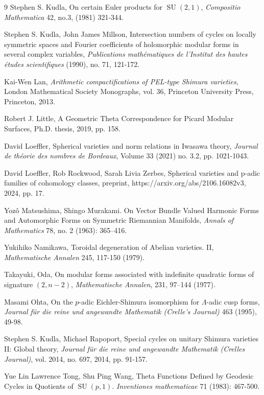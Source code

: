 \documentclass[12pt,a4paper,reqno]{amsart}
\theoremstyle{definition}
\numberwithin{definition}{subsection}
\theoremstyle{definition}
\numberwithin{Definition}{subsection}
\theoremstyle{remark}
\theoremstyle{remark}
\numberwithin{Remark}{subsection}
\theoremstyle{remark}
\theoremstyle{plain}
\numberwithin{Theorem}{subsection}
\theoremstyle{plain}
\theoremstyle{plain}
\theoremstyle{plain}
\theoremstyle{plain}
\theoremstyle{plain}
\theoremstyle{plain}
\theoremstyle{plain}
\DeclareMathOperator{\SU}{SU}
\begin{document}
\begin{thebibliography}{9}
Stephen S. Kudla, On certain Euler products for $\SU(2,1)$, \textit{Compositio Mathematica} 42, no.3, (1981) 321-344.

Stephen S. Kudla, John James Millson, Intersection numbers of cycles on locally symmetric spaces and Fourier
coefficients of holomorphic modular forms in several complex variables, \textit{Publications mathématiques de l'Institut des hautes études scientifiques} (1990), no. 71, 121-172.

Kai-Wen Lan, \emph{Arithmetic compactifications of PEL-type Shimura varieties}, London Mathematical Society Monographs, vol. 36, Princeton University Press, Princeton, 2013.

Robert J. Little, A Geometric Theta Correspondence for Picard Modular Surfaces, Ph.D. thesis, 2019, pp. 158.

David Loeffler, Spherical varieties and norm relations in Iwasawa theory, \textit{Journal de théorie des nombres de Bordeaux}, Volume 33 (2021) no. 3.2, pp. 1021-1043. 

David Loeffler, Rob Rockwood, Sarah Livia Zerbes, Spherical varieties and p-adic families of cohomology classes, preprint, https://arxiv.org/abs/2106.16082v3, 2024, pp. 17.

Yozô Matsushima, Shingo Murakami. On Vector Bundle Valued Harmonic Forms and Automorphic Forms on Symmetric Riemannian Manifolds, \textit{Annals of Mathematics} 78, no. 2 (1963): 365–416.

Yukihiko Namikawa, Toroidal degeneration of Abelian varieties. II, \textit{Mathematische Annalen} 245, 117-150 (1979).

Takayuki, Oda, On modular forms associated with indefinite quadratic forms of signature $(2,n-2)$, \textit{Mathematische Annalen}, 231, 97–144 (1977).

Masami Ohta, On the $p$-adic Eichler-Shimura isomorphism for $\Lambda$-adic cusp forms, \textit{Journal f\"ur die reine und angewandte Mathematik (Crelle's Journal)} 463 (1995), 49-98. 

Stephen S. Kudla, Michael Rapoport, Special cycles on unitary Shimura varieties II: Global theory, \textit{Journal für die reine und angewandte Mathematik (Crelles Journal)}, vol. 2014, no. 697, 2014, pp. 91-157.

Yue Lin Lawrence Tong, Shu Ping Wang, Theta Functions Defined by Geodesic Cycles in Quotients of $\SU(p,1)$. \textit{Inventiones mathematicae} 71 (1983): 467-500.


\end{thebibliography}
\end{document}
